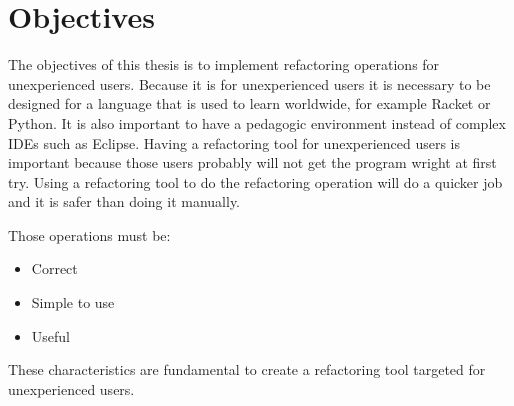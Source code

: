 
% 
% 

\section{Objectives}





The objectives of this thesis is to implement refactoring operations for unexperienced users.
Because it is for unexperienced users it is necessary to be designed for a language that is used to learn worldwide, for example Racket or Python.
It is also important to have a pedagogic environment instead of complex IDEs such as Eclipse.
Having a refactoring tool for unexperienced users is important because those users probably will not get the program wright at first try.
Using a refactoring tool to do the refactoring operation will do a quicker job and it is safer than doing it manually.

Those operations must be:
\begin{itemize}
\item Correct
\item Simple to use
\item Useful
\end{itemize}

These characteristics are fundamental to create a refactoring tool targeted for unexperienced users.